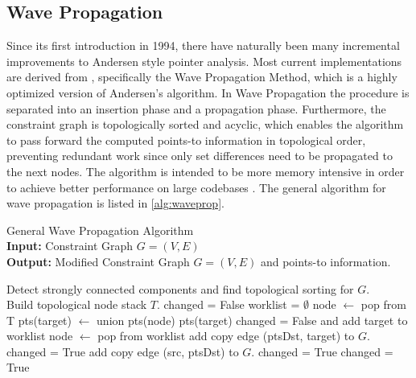 \subsection{Wave Propagation}
Since its first introduction in 1994, there have naturally been many incremental improvements to Andersen style pointer analysis.
Most current implementations are derived from \cite{waveprop}, specifically the Wave Propagation Method, which is a highly optimized version of Andersen's algorithm.
In Wave Propagation the procedure is separated into an insertion phase and a propagation phase. Furthermore, the constraint graph is topologically sorted and acyclic, which enables the algorithm to pass forward the computed points-to information in topological order, preventing redundant work since only set differences need to be propagated to the next nodes. The algorithm is intended to be more memory intensive in order to achieve better performance on large codebases \cite{waveprop}.
The general algorithm for wave propagation is listed in \autoref{alg:waveprop}.

\begin{algorithm}
    \caption[General Wave Propagation Algorithm]{General Wave Propagation Algorithm \\ \textbf{Input:} Constraint Graph $G=(V,E)$ \\ \textbf{Output:} Modified Constraint Graph $G=(V,E)$ and points-to information.}\label{alg:waveprop}
    \begin{algorithmic}
        \State Detect strongly connected components and find topological sorting for $G$. \\ Build topological node stack $T$.
        \Repeat
        \State changed = False
        \State worklist = $\emptyset$
        \State node $\leftarrow$ pop from T
        \State pts(target) $\leftarrow$ union pts(node) pts(target)
        \State changed = False and add target to worklist
        \EndIf
        \EndFor
        \EndWhile
        \State node $\leftarrow$ pop from worklist
        \State add copy edge (ptsDst, target) to $G$.
        \State changed = True
        \EndIf
        \EndFor
        \EndFor
        \State add copy edge (src, ptsDst) to $G$.
        \State changed = True
        \EndIf
        \EndFor
        \EndFor
        \EndWhile
        \State changed = True
        \EndIf
    \end{algorithmic}
\end{algorithm}

